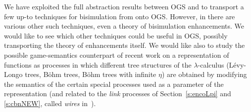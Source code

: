 We have exploited the full abstraction results between OGS and \piI
 to transport a few  up-to techniques for
  bisimulation  from
  \piI onto OGS.  However, in \piI there are various other such techniques, even a theory of
 bisimulation enhancements.  We would like to see which other techniques could be useful
 in OGS,  possibly transporting  the theory of enhancements itself. 
We would like also to study the possible game-semantics counterpart of recent work on a
 representation of functions as processes \cite{SakayoriS23} in which different tree structures of the
$\lambda$-calculus (Lévy-Longo  trees,  Böhm trees,  Böhm trees with infinite $\eta$) are obtained
by modifying the semantics of the certain special processes used as a parameter of the
representation
 (and related to the \emph{link} processes of
Section~\ref{s:encoLpi} and \ref{s:cbnNEW}, called \emph{wires} in~\cite{SakayoriS23}). 